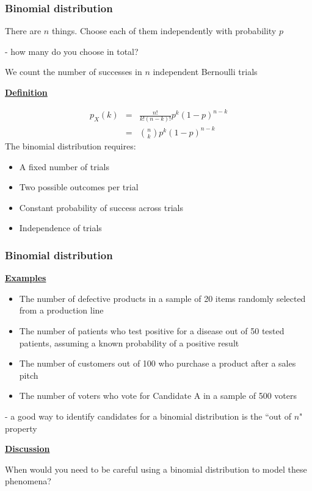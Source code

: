 \documentclass[t,8pt]{beamer}%
\begin{document}
    
	\begin{frame}
		\frametitle{Binomial distribution}
		There are $n$ things. Choose each of them independently with probability $p$ \par
        - how many do you choose in total? \par
		We count the number of successes in $n$ independent Bernoulli trials \par
		{\bf\underline{Definition}} \par
		\begin{eqnarray*}
			p_X(k)&=&\frac{n!}{k!(n-k)!}p^k(1-p)^{n-k}\\
			&=&{n\choose k}p^k(1-p)^{n-k}
		\end{eqnarray*}
		The binomial distribution requires:
		\begin{itemize}
			\item A fixed number of trials
			\item Two possible outcomes per trial
			\item Constant probability of success across trials
			\item Independence of trials
		\end{itemize}
	\end{frame}
	
	\begin{frame}
		\frametitle{Binomial distribution}
		{\bf\underline{Examples}} \par
		\begin{itemize}
			\item The number of defective products in a sample of 20 items randomly selected from a production line
			\item The number of patients who test positive for a disease out of 50 tested patients, assuming a known probability of a positive result
			\item The number of customers out of 100 who purchase a product after a sales pitch
			\item The number of voters who vote for Candidate A in a sample of 500 voters
		\end{itemize}
		{\small\color{NavyBlue} - a good way to identify candidates for a binomial distribution is the ``out of $n$" property} \par
		{\bf\underline{Discussion}} \par
		When would you need to be careful using a binomial distribution to model these phenomena?
	\end{frame}
	
\end{document}
